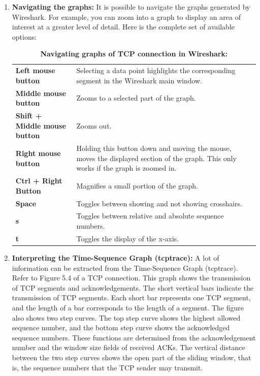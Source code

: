 \begin{enumerate}
	\item \textbf{Navigating the graphs:} It is possible to navigate the graphs generated by Wireshark. For example, you can zoom into a graph to display an area of interest at a greater level of detail. Here is the complete set of available options:
		\begin{table}[ht]
			\centering
			\begin{tabular}{ | l p{8cm} | }
				\hline
				\textbf{Left mouse button} & Selecting a data point highlights the corresponding segment in the Wireshark main window. \\
				\textbf{Middle mouse button} & Zooms to a selected part of the graph. \\
				\textbf{Shift + Middle mouse button} & Zooms out. \\
				\textbf{Right mouse button} & Holding this button down and moving the mouse, moves the displayed section of the graph. This only works if the graph is zoomed in. \\
				\textbf{Ctrl + Right Button} & Magnifies a small portion of the graph. \\
				\textbf{Space} & Toggles between showing and not showing crosshairs. \\
				\textbf{s} & Toggles between relative and absolute sequence numbers. \\
				\textbf{t} & Toggles the display of the x-axis. \\ \hline
			\end{tabular}
			\caption{\textbf{Navigating graphs of TCP connection in Wireshark:}}
		\end{table}
	\item \textbf{Interpreting the Time-Sequence Graph (tcptrace):} A lot of information can be extracted from the Time-Sequence Graph (tcptrace). Refer to Figure 5.4 of a TCP connection. This graph shows the transmission of TCP segments and acknowledgements. The short vertical bars indicate the transmission of TCP segments. Each short bar represents one TCP segment, and the length of a bar corresponds to the length of a segment. The figure also shows two step curves. The top step curve shows the highest allowed sequence number, and the bottom step curve shows the acknowledged sequence numbers. These functions are determined from the acknowledgement number and the window size fields of received ACKs. The vertical distance between the two step curves shows the open part of the sliding window, that is, the sequence numbers that the TCP sender may transmit.\\

\end{enumerate}
